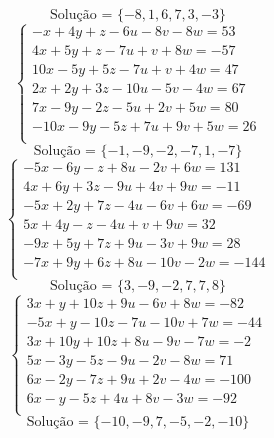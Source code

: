 \documentclass[12pt,oneside,a4paper]{article}
\begin{document}
\begin{equation*}
\text{Solução = }\{-8,1,6,7,3,-3\}
\end{equation*}
\vspace{\baselineskip}
\begin{equation*}
\begin{cases}
-x+4y+z-6u-8v-8w=53 \\
4x+5y+z-7u+v+8w=-57 \\
10x-5y+5z-7u+v+4w=47 \\
2x+2y+3z-10u-5v-4w=67 \\
7x-9y-2z-5u+2v+5w=80 \\
-10x-9y-5z+7u+9v+5w=26 \\
\end{cases}
\end{equation*}
\begin{equation*}
\text{Solução = }\{-1,-9,-2,-7,1,-7\}
\end{equation*}
\vspace{\baselineskip}
\begin{equation*}
\begin{cases}
-5x-6y-z+8u-2v+6w=131 \\
4x+6y+3z-9u+4v+9w=-11 \\
-5x+2y+7z-4u-6v+6w=-69 \\
5x+4y-z-4u+v+9w=32 \\
-9x+5y+7z+9u-3v+9w=28 \\
-7x+9y+6z+8u-10v-2w=-144 \\
\end{cases}
\end{equation*}
\begin{equation*}
\text{Solução = }\{3,-9,-2,7,7,8\}
\end{equation*}
\vspace{\baselineskip}
\begin{equation*}
\begin{cases}
3x+y+10z+9u-6v+8w=-82 \\
-5x+y-10z-7u-10v+7w=-44 \\
3x+10y+10z+8u-9v-7w=-2 \\
5x-3y-5z-9u-2v-8w=71 \\
6x-2y-7z+9u+2v-4w=-100 \\
6x-y-5z+4u+8v-3w=-92 \\
\end{cases}
\end{equation*}
\begin{equation*}
\text{Solução = }\{-10,-9,7,-5,-2,-10\}
\end{equation*}
\end{document}
